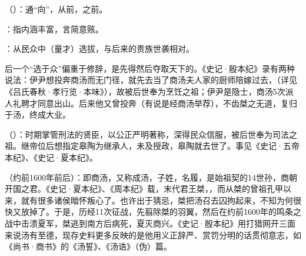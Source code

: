 {
\item {}（）：通“向”，从前，之前。
\item {}：指内涵丰富，言简意赅。
\item {}：从民众中（量才）选拔，与后来的贵族世袭相对。

后一个“选于众”偏重于修辞，是先得然后夺取天下的。《史记·殷本纪》录有两种说法：伊尹想投奔商汤而无门径，就先去当了商汤夫人家的厨师陪嫁过去，（详见《吕氏春秋·孝行览·本味》），故被后世奉为烹饪之祖；伊尹是隐士，商汤5次派人礼聘才同意出山。后来他又曾投奔（有说是经商汤举荐），不齿桀之无道，复归于汤，终成大业。%

\item {}（）：时期掌管刑法的贤臣，以公正严明著称，深得民众信服，被后世奉为司法之祖。继帝位后想指定皋陶为继承人，未及授政，皋陶就去世了。事见《史记·五帝本纪》、《史记·夏本纪》。%

\item {}（约前1600年前后）：即商汤，又称成汤，子姓，名履，是始祖契的14世孙，商朝开国之君。《史记·夏本纪》、《周本纪》载，末代君王桀，，而从桀的曾祖孔甲以来，就有很多诸侯暗怀叛心了。也许出于猜忌，桀把汤召去囚拘起来，不知为何很快又放掉了。于是，历经11次征战，先翦除桀的羽翼，然后在约前1600年的鸣条之战中击溃夏军，桀逃到南方后病死，夏灭商兴。《史记·殷本纪》用打猎网开三面来说汤有至德，现存史料更多反映的是他用义正辞严、赏罚分明的话贯彻意志，如《尚书·商书》的《汤誓》、《汤诰》（伪）篇。

}

